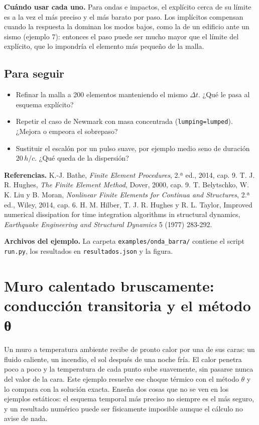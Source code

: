\documentclass[11pt,oneside]{report}
\renewcommand{\chaptermark}[1]{\markboth{Cap.\ \thechapter\ ---\ #1}{}}
\begin{document}
\textbf{Cuándo usar cada uno.} Para ondas e impactos, el explícito cerca de su límite es a la vez el más preciso y el más barato por paso. Los implícitos compensan cuando la respuesta la dominan los modos bajos, como la de un edificio ante un sismo (ejemplo 7): entonces el paso puede ser mucho mayor que el límite del explícito, que lo impondría el elemento más pequeño de la malla.

\section{Para seguir}

\begin{itemize}
  \item Refinar la malla a 200 elementos manteniendo el mismo $\Delta t$. ¿Qué le pasa al esquema explícito?
  \item Repetir el caso de Newmark con masa concentrada (\texttt{lumping=\textquotedbl{}lumped\textquotedbl{}}). ¿Mejora o empeora el sobrepaso?
  \item Sustituir el escalón por un pulso suave, por ejemplo medio seno de duración $20\,h/c$. ¿Qué queda de la dispersión?
\end{itemize}

\textbf{Referencias.} K.-J. Bathe, \textit{Finite Element Procedures}, 2.ª ed., 2014, cap. 9. T. J. R. Hughes, \textit{The Finite Element Method}, Dover, 2000, cap. 9. T. Belytschko, W. K. Liu y B. Moran, \textit{Nonlinear Finite Elements for Continua and Structures}, 2.ª ed., Wiley, 2014, cap. 6. H. M. Hilber, T. J. R. Hughes y R. L. Taylor, \textquotedbl{}Improved numerical dissipation for time integration algorithms in structural dynamics\textquotedbl{}, \textit{Earthquake Engineering and Structural Dynamics} 5 (1977) 283-292.

\textbf{Archivos del ejemplo.} La carpeta \texttt{examples/\allowbreak{}onda\_\allowbreak{}barra/\allowbreak{}} contiene el script \texttt{run.py}, los resultados en \texttt{resultados.json} y la figura.


\newpage

\chapter{Muro calentado bruscamente: conducción transitoria y el método θ}
\chaptermark{Muro calentado bruscamente}
\label{cap:muro_termico}





Un muro a temperatura ambiente recibe de pronto calor por una de sus caras: un fluido caliente, un incendio, el sol después de una noche fría. El calor penetra poco a poco y la temperatura de cada punto sube suavemente, sin pasarse nunca del valor de la cara. Este ejemplo resuelve ese choque térmico con el método \ensuremath{\theta} y lo compara con la solución exacta. Enseña dos cosas que no se ven en los ejemplos estáticos: el esquema temporal más preciso no siempre es el más seguro, y un resultado numérico puede ser físicamente imposible aunque el cálculo no avise de nada.
\end{document}
